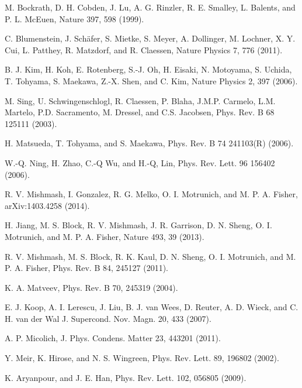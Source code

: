 \documentclass[article,11pt]{revtex4}
\begin{document}
\begin{thebibliography}{199}
 M. Bockrath, D. H. Cobden, J. Lu, A. G. Rinzler,
R. E. Smalley, L. Balents, and P. L. McEuen, Nature 397, 598
(1999).

 C. Blumenstein, J. Sch\"afer, S. Mietke, S. Meyer, A.
Dollinger, M. Lochner, X. Y. Cui, L. Patthey, R. Matzdorf, and R.
Claessen, Nature Physics 7, 776 (2011).

 B. J. Kim, H. Koh, E. Rotenberg, S.-J. Oh, H. Eisaki, N.
Motoyama, S. Uchida, T. Tohyama, S. Maekawa, Z.-X. Shen, and C.
Kim, Nature Physics 2, 397 (2006).

 M. Sing, U. Schwingenschlogl, R. Claessen, P.
Blaha, J.M.P. Carmelo, L.M. Martelo, P.D. Sacramento, M. Dressel,
and C.S. Jacobsen, Phys. Rev. B 68 125111 (2003).

 H. Matsueda, T. Tohyama, and S. Maekawa, Phys.
Rev. B 74 241103(R) (2006).

 W.-Q. Ning, H. Zhao, C.-Q Wu, and H.-Q, Lin, Phys.
Rev. Lett. 96 156402 (2006).

 R. V. Mishmash, I. Gonzalez, R. G. Melko, O. I. Motrunich, and M. P. A. Fisher, arXiv:1403.4258 (2014).

 H. Jiang, M. S. Block, R. V. Mishmash, J. R. Garrison, D. N. Sheng, O. I. Motrunich, and M. P. A. Fisher, Nature 493, 39 (2013).

 R. V. Mishmash, M. S. Block, R. K. Kaul, D. N. Sheng, O. I. Motrunich, and M. P. A. Fisher, Phys. Rev. B 84, 245127 (2011).

 K. A. Matveev, Phys. Rev. B 70, 245319 (2004).

 E. J. Koop, A. I. Lerescu, J. Liu, B. J. van Wees, D. Reuter, A. D. Wieck, and C. H. van der Wal
J. Supercond. Nov. Magn. 20, 433 (2007).

 A. P. Micolich, J. Phys. Condens. Matter 23, 443201 (2011).

 Y. Meir, K. Hirose, and N. S. Wingreen, Phys. Rev. Lett. 89, 196802 (2002).

 K. Aryanpour, and J. E. Han, Phys. Rev. Lett. 102, 056805 (2009).

\end{thebibliography}
\end{document}
